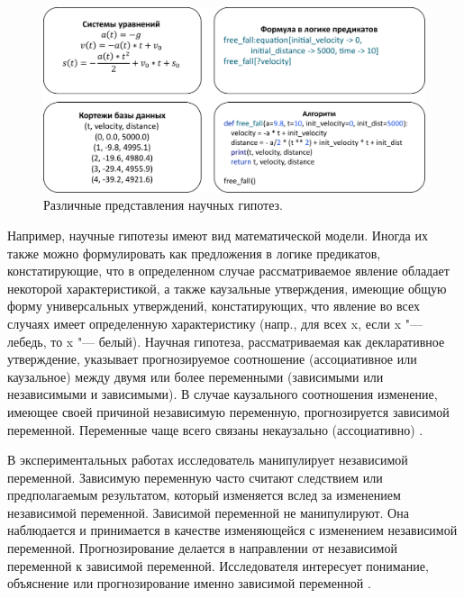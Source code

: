 \begin{figure}[ht]
    \centering
    \includegraphics[width=1.0\linewidth]{images/hypothesis_representation.pdf}
    \caption{Различные представления научных гипотез.}\label{fig:hypothesis_representation}
\end{figure}

Например, научные гипотезы имеют вид математической модели. Иногда их также можно формулировать как предложения в 
логике предикатов, констатирующие, что в определенном случае рассматриваемое явление обладает некоторой 
характеристикой, а также каузальные утверждения, имеющие общую форму универсальных утверждений, 
констатирующих, что явление во всех случаях имеет определенную характеристику (напр., для всех x, если 
x "--- лебедь, то x "--- белый). Научная гипотеза, рассматриваемая как декларативное утверждение, указывает 
прогнозируемое соотношение (ассоциативное или каузальное) между двумя или более переменными (зависимыми или 
независимыми и зависимыми). В случае каузального соотношения изменение, имеющее своей причиной независимую переменную, 
прогнозируется зависимой переменной. Переменные чаще всего связаны некаузально (ассоциативно) \cite{Haber2009}.

В экспериментальных работах исследователь манипулирует независимой переменной. Зависимую переменную часто считают 
следствием или предполагаемым результатом, который изменяется вслед за изменением независимой переменной. Зависимой 
переменной не манипулируют. Она наблюдается и принимается в качестве изменяющейся с изменением независимой переменной. 
Прогнозирование делается в направлении от независимой переменной к зависимой переменной. Исследователя интересует 
понимание, объяснение или прогнозирование именно зависимой переменной \cite{Haber2009}.

